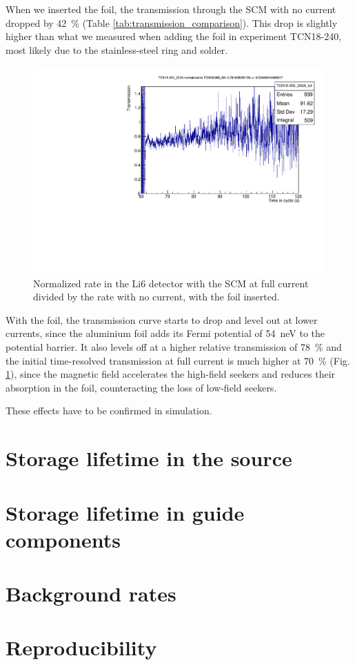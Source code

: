 \documentclass[10pt,letterpaper]{article}
\begin{document}
When we inserted the foil, the transmission through the SCM with no current dropped by \SI{42}{\percent} (Table \ref{tab:transmission_comparison}). This drop is slightly higher than what we measured when adding the foil in experiment TCN18-240, most likely due to the stainless-steel ring and solder.

\begin{figure}
\centering
\includegraphics[width=\textwidth,page=1]{../transmission/TCN18-265_200A_TCN18-265_0A.pdf}
\caption{Normalized rate in the Li6 detector with the SCM at full current divided by the rate with no current, with the foil inserted.}
\label{fig:SCMtof_foil}
\end{figure}

With the foil, the transmission curve starts to drop and level out at lower currents, since the aluminium foil adds its Fermi potential of \SI{54}{\nano\electronvolt} to the potential barrier. It also levels off at a higher relative transmission of \SI{78}{\percent} and the initial time-resolved transmission at full current is much higher at \SI{70}{\percent} (Fig. \ref{fig:SCMtof_foil}), since the magnetic field accelerates the high-field seekers and reduces their absorption in the foil, counteracting the loss of low-field seekers.

These effects have to be confirmed in simulation.



\section{Storage lifetime in the source}




\section{Storage lifetime in guide components}




\section{Background rates}
\label{sec:background}



\section{Reproducibility}
\end{document}
